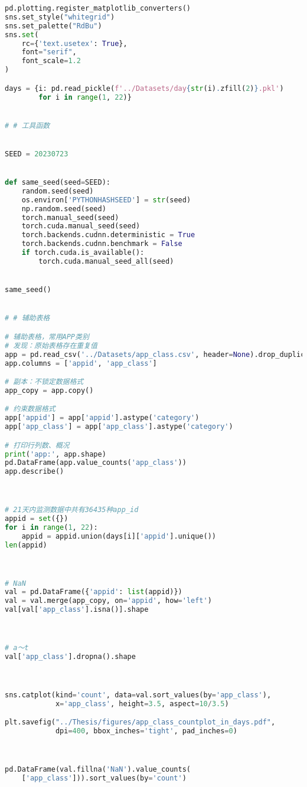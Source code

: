 \documentclass[withoutpreface,bwprint]{cumcmthesis}
\begin{document}
\begin{appendices}
\begin{lstlisting}[language=Python]
pd.plotting.register_matplotlib_converters()
sns.set_style("whitegrid")
sns.set_palette("RdBu")
sns.set(
    rc={'text.usetex': True},
    font="serif",
    font_scale=1.2
)

days = {i: pd.read_pickle(f'../Datasets/day{str(i).zfill(2)}.pkl')
        for i in range(1, 22)}


# # 工具函数


SEED = 20230723


def same_seed(seed=SEED):
    random.seed(seed)
    os.environ['PYTHONHASHSEED'] = str(seed)
    np.random.seed(seed)
    torch.manual_seed(seed)
    torch.cuda.manual_seed(seed)
    torch.backends.cudnn.deterministic = True
    torch.backends.cudnn.benchmark = False
    if torch.cuda.is_available():
        torch.cuda.manual_seed_all(seed)


same_seed()


# # 辅助表格

# 辅助表格，常用APP类别
# 发现：原始表格存在重复值
app = pd.read_csv('../Datasets/app_class.csv', header=None).drop_duplicates()
app.columns = ['appid', 'app_class']

# 副本：不锁定数据格式
app_copy = app.copy()

# 约束数据格式
app['appid'] = app['appid'].astype('category')
app['app_class'] = app['app_class'].astype('category')

# 打印行列数、概况
print('app:', app.shape)
pd.DataFrame(app.value_counts('app_class'))
app.describe()



# 21天内监测数据中共有36435种app_id
appid = set({})
for i in range(1, 22):
    appid = appid.union(days[i]['appid'].unique())
len(appid)



# NaN
val = pd.DataFrame({'appid': list(appid)})
val = val.merge(app_copy, on='appid', how='left')
val[val['app_class'].isna()].shape



# a～t
val['app_class'].dropna().shape



sns.catplot(kind='count', data=val.sort_values(by='app_class'),
            x='app_class', height=3.5, aspect=10/3.5)

plt.savefig("../Thesis/figures/app_class_countplot_in_days.pdf",
            dpi=400, bbox_inches='tight', pad_inches=0)



pd.DataFrame(val.fillna('NaN').value_counts(
    ['app_class'])).sort_values(by='count')
 \end{lstlisting}


\end{appendices}
\end{document}
